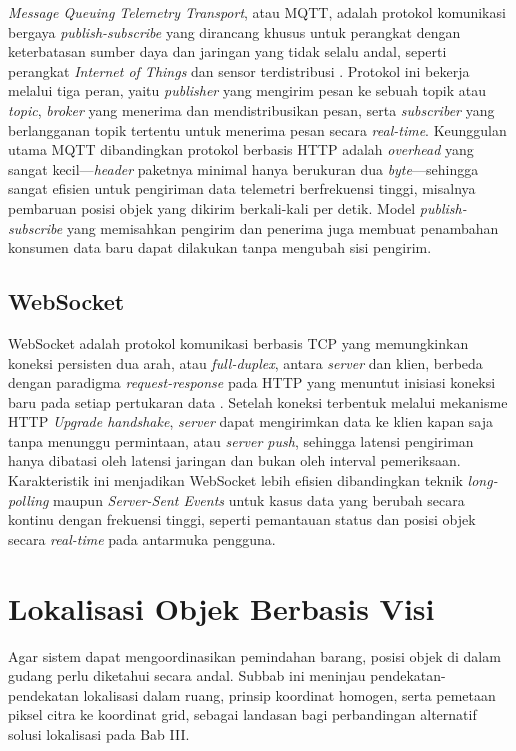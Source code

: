 \textit{Message Queuing Telemetry Transport}, atau MQTT, adalah protokol komunikasi bergaya \textit{publish-subscribe} yang dirancang khusus untuk perangkat dengan keterbatasan sumber daya dan jaringan yang tidak selalu andal, seperti perangkat \textit{Internet of Things} dan sensor terdistribusi \autocite{oasis2014}. Protokol ini bekerja melalui tiga peran, yaitu \textit{publisher} yang mengirim pesan ke sebuah topik atau \textit{topic}, \textit{broker} yang menerima dan mendistribusikan pesan, serta \textit{subscriber} yang berlangganan topik tertentu untuk menerima pesan secara \textit{real-time}. Keunggulan utama MQTT dibandingkan protokol berbasis HTTP adalah \textit{overhead} yang sangat kecil---\textit{header} paketnya minimal hanya berukuran dua \textit{byte}---sehingga sangat efisien untuk pengiriman data telemetri berfrekuensi tinggi, misalnya pembaruan posisi objek yang dikirim berkali-kali per detik. Model \textit{publish-subscribe} yang memisahkan pengirim dan penerima juga membuat penambahan konsumen data baru dapat dilakukan tanpa mengubah sisi pengirim.

\subsection{WebSocket}

WebSocket adalah protokol komunikasi berbasis TCP yang memungkinkan koneksi persisten dua arah, atau \textit{full-duplex}, antara \textit{server} dan klien, berbeda dengan paradigma \textit{request-response} pada HTTP yang menuntut inisiasi koneksi baru pada setiap pertukaran data \autocite{fette2011}. Setelah koneksi terbentuk melalui mekanisme HTTP \textit{Upgrade handshake}, \textit{server} dapat mengirimkan data ke klien kapan saja tanpa menunggu permintaan, atau \textit{server push}, sehingga latensi pengiriman hanya dibatasi oleh latensi jaringan dan bukan oleh interval pemeriksaan. Karakteristik ini menjadikan WebSocket lebih efisien dibandingkan teknik \textit{long-polling} maupun \textit{Server-Sent Events} untuk kasus data yang berubah secara kontinu dengan frekuensi tinggi, seperti pemantauan status dan posisi objek secara \textit{real-time} pada antarmuka pengguna.

\section{Lokalisasi Objek Berbasis Visi}
\label{sec:lokalisasi-visi}

Agar sistem dapat mengoordinasikan pemindahan barang, posisi objek di dalam gudang perlu diketahui secara andal. Subbab ini meninjau pendekatan-pendekatan lokalisasi dalam ruang, prinsip koordinat homogen, serta pemetaan piksel citra ke koordinat grid, sebagai landasan bagi perbandingan alternatif solusi lokalisasi pada Bab III.

